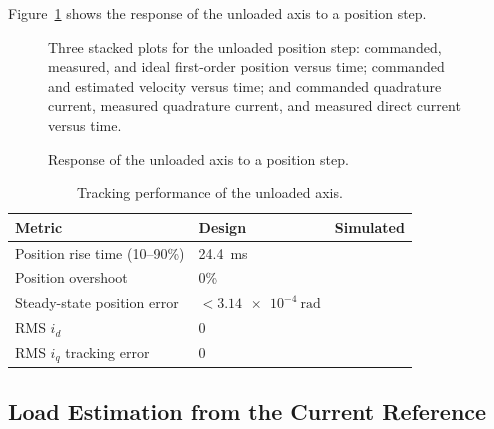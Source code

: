 Figure~\ref{fig:step_response} %
shows the response of the unloaded axis to a position step. %
\begin{figure}[htbp]
	\centering
		{Three stacked plots for the unloaded position step: commanded, measured, and ideal first-order position versus time; commanded and estimated velocity versus time; and commanded quadrature current, measured quadrature current, and measured direct current versus time.}
	\caption[Unloaded step response]{Response of the unloaded axis to a position step.}
	\label{fig:step_response}
\end{figure}

\begin{table}[htbp]
	\centering
	\caption{Tracking performance of the unloaded axis.}
	\vspace{4pt}
	\label{tab:exp_performance}
	\begin{tabular}{lll}
		\hline
		Metric & Design & Simulated \\
		\hline
		Position rise time (10--90\%)  & \SI{24.4}{\milli\second} & %
		\\
		Position overshoot             & 0\%                      & %
		\\
		Steady-state position error    & $< \SI{3.14e-4}{\radian}$ & %
		\\
		RMS $i_d$                      & 0                        & %
		\\
		RMS $i_q$ tracking error       & 0                        & %
		\\
		\hline
	\end{tabular}
\end{table}


\subsection{Load Estimation from the Current Reference}\label{sec:expLoad}

